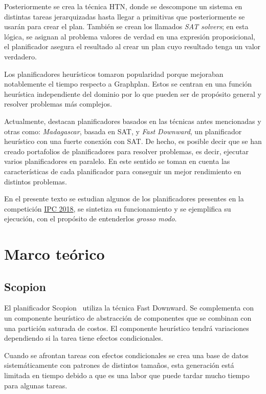 \documentclass[a4paper,12pt,twocolumn]{article}
\begin{document}
Posteriormente se crea la técnica HTN, donde se descompone un sistema en distintas tareas jerarquizadas hasta llegar a primitivas que posteriormente se usarán para crear el plan. También se crean los llamados \emph{SAT solvers}; en esta lógica, se asignan al problema valores de verdad en una expresión proposicional, el planificador asegura el resultado al crear un plan cuyo resultado tenga un valor verdadero.~\citep{Tapia_García_2017}

Los planificadores heurísticos tomaron popularidad porque mejoraban notablemente el tiempo respecto a Graphplan. Estos se centran en una función heurística independiente del dominio por lo que pueden ser de propósito general y resolver problemas más complejos.~\citep{Tapia_García_2017}

Actualmente, destacan planificadores basados en las técnicas antes mencionadas y otras como: \emph{Madagascar}, basada en SAT, y \emph{Fast Downward}, un planificador heurístico con una fuerte conexión con SAT. De hecho, es posible decir que se han creado portafolios de planificadores para resolver problemas, es decir, ejecutar varios planificadores en paralelo. En este sentido se toman en cuenta las características de cada planificador para conseguir un mejor rendimiento en distintos problemas.~\citep{Tapia_García_2017}

En el presente texto se estudian algunos de los planificadores presentes en la competición \href{https://ipc2018-classical.bitbucket.io/}{IPC 2018}, se sintetiza su funcionamiento y se ejemplifica su ejecución, con el propósito de entenderlos \textit{grosso modo}.

\section{Marco teórico}

\subsection{Scopion}

El planificador Scopion~\citep{seipp2018scorpion} utiliza la técnica Fast Downward. Se complementa con un componente heurístico de abstracción de componentes que se combinan con una partición saturada de costos. El componente heurístico tendrá variaciones dependiendo si la tarea tiene efectos condicionales.

Cuando se afrontan tareas con efectos condicionales se crea una base de datos sistemáticamente con patrones de distintos tamaños, esta generación está limitada en tiempo debido a que es una labor que puede tardar mucho tiempo para algunas tareas.
\end{document}
